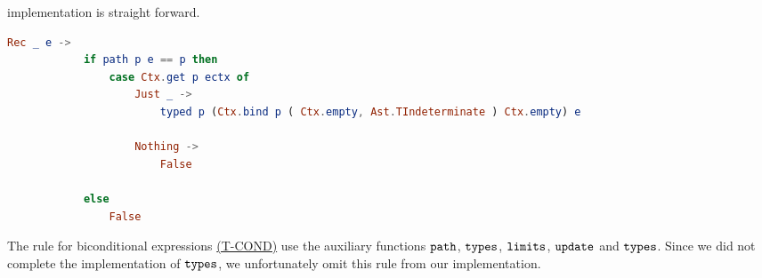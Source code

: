 implementation is straight forward.
\begin{lstlisting}[language=elm,%
    gobble=8,%
    ]
        Rec _ e ->
            if path p e == p then
                case Ctx.get p ectx of
                    Just _ ->
                        typed p (Ctx.bind p ( Ctx.empty, Ast.TIndeterminate ) Ctx.empty) e

                    Nothing ->
                        False

            else
                False
\end{lstlisting}
The rule for biconditional expressions \hyperref[fig:asttyperules]{(T-COND)}
use the auxiliary functions $\texttt{path}$, $\texttt{types}$, $\texttt{limits}$,
$\texttt{update}$ and $\texttt{types}$. Since we did not complete the implementation
of $\texttt{types}$, we unfortunately omit this rule from our implementation.\\

